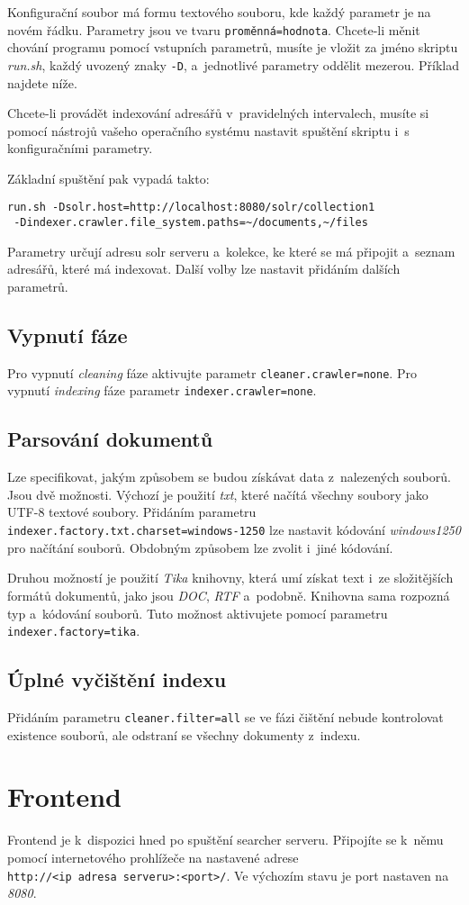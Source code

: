 Konfigurační soubor má formu textového souboru, kde každý parametr je na novém řádku. Parametry jsou ve tvaru \verb|proměnná=hodnota|. Chcete-li měnit chování programu pomocí vstupních parametrů, musíte je vložit za jméno skriptu \emph{run.sh}, každý uvozený znaky \verb|-D|, a~jednotlivé parametry oddělit mezerou. Příklad najdete níže.
 
Chcete-li provádět indexování adresářů v~pravidelných intervalech, musíte si pomocí nástrojů vašeho operačního systému nastavit spuštění skriptu i~s konfiguračními parametry. 

Základní spuštění pak vypadá takto:
\begin{verbatim}
run.sh -Dsolr.host=http://localhost:8080/solr/collection1 
 -Dindexer.crawler.file_system.paths=~/documents,~/files
\end{verbatim}
Parametry určují adresu solr serveru a~kolekce, ke které se má připojit a~seznam adresářů, které má indexovat. Další volby lze nastavit přidáním dalších parametrů.

\subsection{Vypnutí fáze}
Pro vypnutí \emph{cleaning} fáze aktivujte parametr \verb|cleaner.crawler=none|. Pro vypnutí \emph{indexing} fáze parametr \verb|indexer.crawler=none|.

\subsection{Parsování dokumentů}
Lze specifikovat, jakým způsobem se budou získávat data z~nalezených souborů. Jsou dvě možnosti. Výchozí je použití \emph{txt}, které načítá všechny soubory jako UTF-8 textové soubory. Přidáním parametru \\\verb|indexer.factory.txt.charset=windows-1250| lze nastavit kódování \emph{windows1250} pro načítání souborů. Obdobným způsobem lze zvolit i~jiné kódování.

Druhou možností je použití \emph{Tika} knihovny, která umí získat text i~ze složitějších formátů dokumentů, jako jsou \emph{DOC}, \emph{RTF} a~podobně. Knihovna sama rozpozná typ a~kódování souborů. Tuto možnost aktivujete pomocí parametru \verb|indexer.factory=tika|.

\subsection{Úplné vyčištění indexu}
Přidáním parametru \verb|cleaner.filter=all| se ve fázi čištění nebude kontrolovat existence souborů, ale odstraní se všechny dokumenty z~indexu.

\section{Frontend}
Frontend je k~dispozici hned po spuštění searcher serveru. Připojíte se k~němu pomocí internetového prohlížeče na nastavené adrese \\ \verb|http://<ip adresa serveru>:<port>/|. Ve výchozím stavu je port nastaven na \emph{8080}.